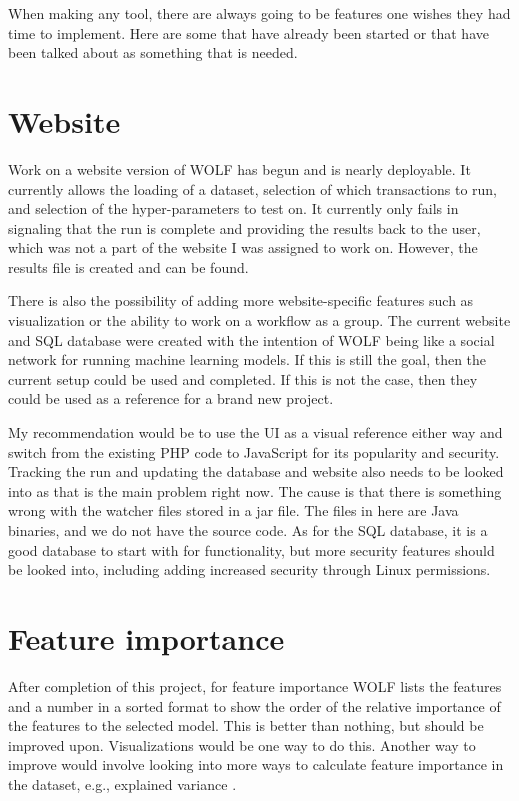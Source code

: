 When making any tool, there are always going to be features one wishes they had time to implement. Here are some that have already been started or that have been talked about as something that is needed.

\section*{Website}
Work on a website version of WOLF has begun and is nearly deployable. It currently allows the loading of a dataset, selection of which transactions to run, and selection of the hyper-parameters to test on. It currently only fails in signaling that the run is complete and providing the results back to the user, which was not a part of the website I was assigned to work on. However, the results file is created and can be found.

There is also the possibility of adding more website-specific features such as visualization or the ability to work on a workflow as a group. The current website and SQL database were created with the intention of WOLF being like a social network for running machine learning models. If this is still the goal, then the current setup could be used and completed. If this is not the case, then they could be used as a reference for a brand new project.

My recommendation would be to use the UI as a visual reference either way and switch from the existing PHP code to JavaScript for its popularity and security. Tracking the run and updating the database and website also needs to be looked into as that is the main problem right now. The cause is that there is something wrong with the watcher files stored in a jar file. The files in here are Java binaries, and we do not have the source code. As for the SQL database, it is a good database to start with for functionality, but more security features should be looked into, including adding increased security through Linux permissions.

\section*{Feature importance}
After completion of this project, for feature importance WOLF lists the features and a number in a sorted format to show the order of the relative importance of the features to the selected model. This is better than nothing, but should be improved upon. Visualizations would be one way to do this. Another way to improve would involve looking into more ways to calculate feature importance in the dataset, e.g., explained variance \parencite{HandsOn}. 

